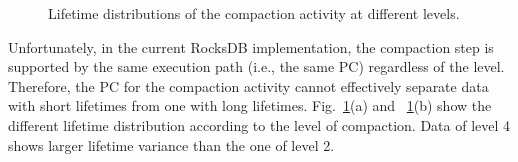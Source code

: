 
\begin{figure}[!t]
\centering
{}  %
	\hspace{10pt}
\caption{Lifetime distributions of the compaction activity at different levels.} %
\label{fig:compaction}
\end{figure}




Unfortunately, in the current RocksDB implementation, the compaction step is supported 
by the same execution path (i.e., the same PC) regardless of the level.
Therefore, the PC for the compaction activity cannot effectively separate data with 
short lifetimes from one with long lifetimes.
Fig.~\ref{fig:compaction}(a) and ~\ref{fig:compaction}(b) show
the different lifetime distribution according to the level of compaction.
Data of level 4 shows larger lifetime variance than the one of level 2.

